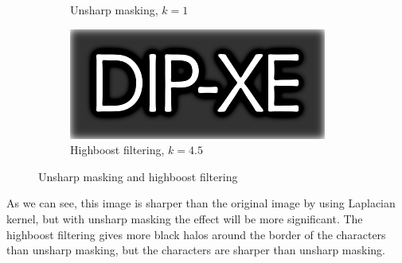 \documentclass[UTF8]{ctexart}
\begin{document}
\begin{figure}[htbp]
\begin{subfigure}{0.3\textwidth}
        \caption{Unsharp masking, $k=1$}
    \end{subfigure}
    \hfill
    \begin{subfigure}{0.3\textwidth}
        \centering
        \includegraphics[width=\linewidth]{dipxe_text_highboost_sharpen.png}
        \caption{Highboost filtering, $k=4.5$}
    \end{subfigure}

    \caption{Unsharp masking and highboost filtering}
\end{figure}

As we can see, this image is sharper than the original image by using Laplacian kernel, but with unsharp masking the effect will be more
significant. The highboost filtering gives more black halos around the border of the characters than unsharp masking, but the characters are
sharper than unsharp masking.\\
\end{document}
